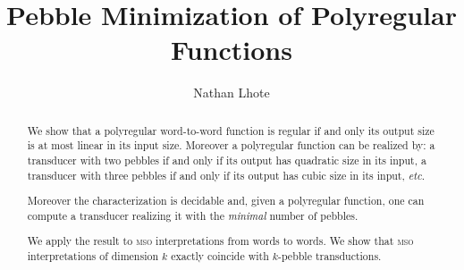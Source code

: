 \documentclass[sigplan,review,anonymous]{acmart}\settopmatter{printfolios=true,printccs=false,printacmref=false}
\newcommand{\mso}{\textsc{mso}\xspace}
\theoremstyle{definition}
\theoremstyle{remark}
\begin{document}
\title[Pebble Minimization of Polyregular Functions]{Pebble Minimization of Polyregular Functions}         %



\author{Nathan Lhote}



\begin{abstract}
  We show that a polyregular word-to-word function is regular if and only its output size is at most linear in its input size. Moreover a polyregular function can be realized by: a transducer with two pebbles if and only if its output has quadratic size in its input, a transducer with three pebbles if and only if its output has cubic size in its input, \textit{etc}.

  Moreover the characterization is decidable and, given a polyregular function, one can compute a transducer realizing it with the \emph{minimal} number of pebbles.
  
  We apply the result to \mso interpretations from words to words. We show that \mso interpretations of dimension $k$ exactly coincide with $k$-pebble transductions.
\end{abstract}
\end{document}
